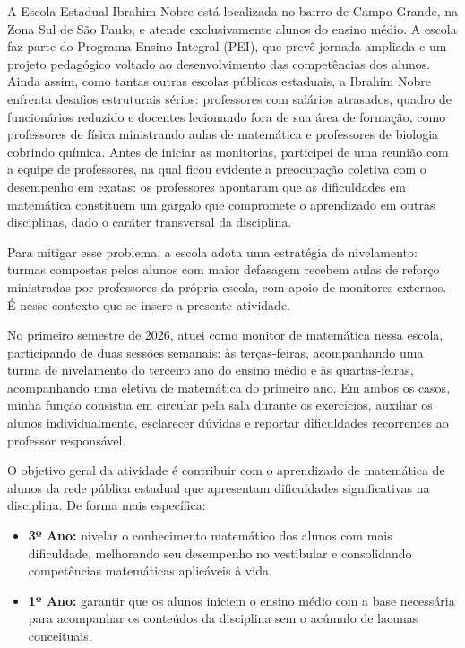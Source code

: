 \documentclass[11pt]{article}
\begin{document}
A Escola Estadual Ibrahim Nobre está localizada no bairro de Campo Grande, na Zona Sul de São Paulo, e atende exclusivamente alunos do ensino médio. A escola faz parte do Programa Ensino Integral (PEI), que prevê jornada ampliada e um projeto pedagógico voltado ao desenvolvimento das competências dos alunos. Ainda assim, como tantas outras escolas públicas estaduais, a Ibrahim Nobre enfrenta desafios estruturais sérios: professores com salários atrasados, quadro de funcionários reduzido e docentes lecionando fora de sua área de formação, como professores de física ministrando aulas de matemática e professores de biologia cobrindo química. Antes de iniciar as monitorias, participei de uma reunião com a equipe de professores, na qual ficou evidente a preocupação coletiva com o desempenho em exatas: os professores apontaram que as dificuldades em matemática constituem um gargalo que compromete o aprendizado em outras disciplinas, dado o caráter transversal da disciplina.

Para mitigar esse problema, a escola adota uma estratégia de nivelamento: turmas compostas pelos alunos com maior defasagem recebem aulas de reforço ministradas por professores da própria escola, com apoio de monitores externos. É nesse contexto que se insere a presente atividade.
 
No primeiro semestre de 2026, atuei como monitor de matemática nessa escola, participando de duas sessões semanais: às terças-feiras, acompanhando uma turma de nivelamento do terceiro ano do ensino médio e às quartas-feiras, acompanhando uma eletiva de matemática do primeiro ano. Em ambos os casos, minha função consistia em circular pela sala durante os exercícios, auxiliar os alunos individualmente, esclarecer dúvidas e reportar dificuldades recorrentes ao professor responsável.

O objetivo geral da atividade é contribuir com o aprendizado de matemática de alunos da rede pública estadual que apresentam dificuldades significativas na disciplina. De forma mais específica:

\begin{itemize}
	\item \textbf{3º Ano:} nivelar o conhecimento matemático dos alunos com mais dificuldade, melhorando seu desempenho no vestibular e consolidando competências matemáticas aplicáveis à vida.
	\item \textbf{1º Ano:} garantir que os alunos iniciem o ensino médio com a base necessária para acompanhar os conteúdos da disciplina sem o acúmulo de lacunas conceituais.
\end{itemize}
\end{document}
